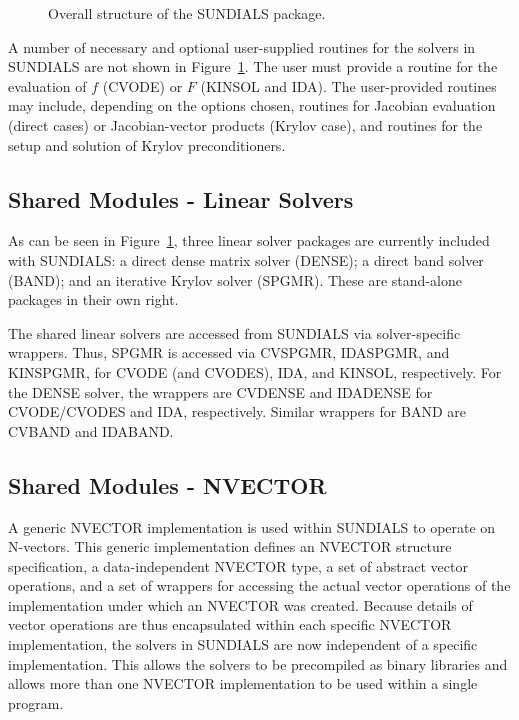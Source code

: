 \begin{figure}[tp]
\centerline{}
\caption{Overall structure of the SUNDIALS  package.}
\label{fig-sunorg}
\end{figure}

A number of necessary and optional user-supplied routines for the solvers 
in SUNDIALS
are not shown in \mbox{Figure \ref{fig-sunorg}}. The user must
provide a routine for the evaluation of $f$ (CVODE) or $F$ (KINSOL and
IDA). The user-provided routines may include, depending on the options
chosen, routines for Jacobian evaluation (direct cases) or Jacobian-vector
products (Krylov case), and routines for the setup and solution of Krylov
preconditioners.


\subsection{Shared Modules - Linear Solvers}

As can be seen in \mbox{Figure \ref{fig-sunorg}}, three linear solver
packages are currently included with SUNDIALS: a direct dense matrix solver
(DENSE); a direct band solver (BAND); and an iterative Krylov solver
(SPGMR). These are stand-alone packages in their own right.

The shared linear solvers are accessed from SUNDIALS via
solver-specific wrappers. 
Thus, SPGMR is accessed via CVSPGMR, IDASPGMR, and
KINSPGMR, for CVODE (and CVODES), IDA, and KINSOL, respectively. For the
DENSE solver, the wrappers are CVDENSE and IDADENSE for CVODE/CVODES and
IDA, respectively. Similar wrappers for BAND are CVBAND and IDABAND. 

\subsection{Shared Modules - NVECTOR}

A generic NVECTOR implementation is used within SUNDIALS to
operate on N-vectors. This generic implementation defines an NVECTOR
structure specification, a data-independent NVECTOR type, a set of abstract
vector operations, and a set of wrappers for accessing the actual vector
operations of the implementation under which an NVECTOR was created. Because
details of vector operations are thus encapsulated within each specific
NVECTOR implementation, the solvers in SUNDIALS 
are now independent of a specific
implementation. This allows the solvers to be precompiled as binary
libraries and allows more than one NVECTOR implementation to be used within
a single program.


